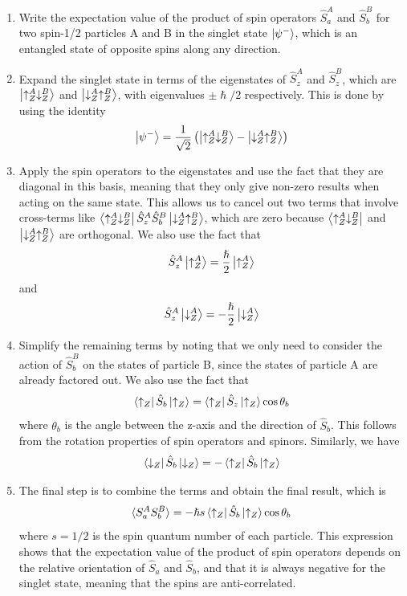 \documentclass{article}
\begin{document}
\begin{enumerate} 
\item Write the expectation value of the product of spin operators $\hat{S}_a^A$ and $\hat{S}_b^B$ for two spin-1/2 particles A and B in the singlet state $\ket{\psi^-}$, which is an entangled state of opposite spins along any direction. \\ 
\item Expand the singlet state in terms of the eigenstates of $\hat{S}_z^A$ and $\hat{S}_z^B$, which are $\ket{\uparrow^A_Z \downarrow^B_Z}$ and $\ket{\downarrow^A_Z \uparrow^B_Z}$, with eigenvalues $\pm \hslash/2$ respectively. This is done by using the identity $$\ket{\psi^-} = \frac{1}{\sqrt{2}} \left( \ket{\uparrow^A_Z \downarrow^B_Z} - \ket{\downarrow^A_Z \uparrow^B_Z} \right)$$
 \item Apply the spin operators to the eigenstates and use the fact that they are diagonal in this basis, meaning that they only give non-zero results when acting on the same state. This allows us to cancel out two terms that involve cross-terms like $\bra{\uparrow^A_Z \downarrow^B_Z} \hat{S}_z^A\hat{S}_b^B \ket{\downarrow^A_Z \uparrow^B_Z}$, which are zero because $\bra{\uparrow^A_Z \downarrow^B_Z}$ and $\ket{\downarrow^A_Z \uparrow^B_Z}$ are orthogonal. We also use the fact that $$\hat{S}_z^A\ket{\uparrow^A_Z} = \frac{\hslash}{2}\ket{\uparrow^A_Z}$$ and $$\hat{S}_z^A\ket{\downarrow^A_Z} = -\frac{\hslash}{2}\ket{\downarrow^A_Z}$$
 \item Simplify the remaining terms by noting that we only need to consider the action of $\hat{S}_b^B$ on the states of particle B, since the states of particle A are already factored out. We also use the fact that $$\bra{\uparrow_Z}\hat{S}_b\ket{\uparrow_Z} = \bra{\uparrow_Z}\hat{S}_z\ket{\uparrow_Z}\cos\theta_b$$ where $\theta_b$ is the angle between the z-axis and the direction of $\hat{S}_b$. This follows from the rotation properties of spin operators and spinors. Similarly, we have $$\bra{\downarrow_Z}\hat{S}_b\ket{\downarrow_Z} = -\bra{\uparrow_Z}\hat{S}_b\ket{\uparrow_Z}$$
 \item  The final step is to combine the terms and obtain the final result, which is $$\langle S_a^AS_b^B \rangle = - \hslash s \bra{\uparrow_Z}\hat{S}_b\ket{\uparrow_Z}\cos\theta_b$$ where $s=1/2$ is the spin quantum number of each particle. This expression shows that the expectation value of the product of spin operators depends on the relative orientation of $\hat{S}_a$ and $\hat{S}_b$, and that it is always negative for the singlet state, meaning that the spins are anti-correlated.
 \end{enumerate}
\end{document}
